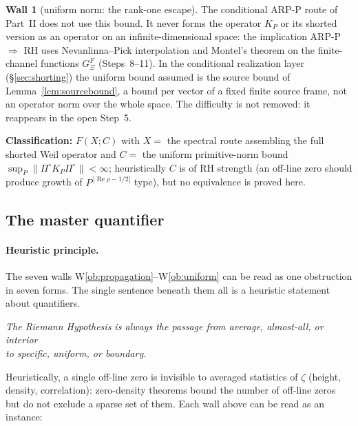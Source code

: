 \documentclass[11pt]{amsart}
\theoremstyle{definition}
\theoremstyle{remark}
\theoremstyle{definition}
\newtheorem{obstruction}{Wall}[section]
\renewcommand{\Re}{\operatorname{Re}}
\newcommand{\GXi}{G_\Xi}
\begin{document}
\begin{obstruction}[uniform norm: the rank-one escape]
The conditional ARP-P route of Part~II does not use this bound. It never forms the operator $K_P$ or its
shorted version as an operator on an infinite-dimensional space: the implication ARP-P $\Rightarrow$ RH
uses Nevanlinna--Pick interpolation and Montel's theorem on the finite-channel functions $\GXi^F$
(Steps~8--11). In the conditional realization layer (\S\ref{sec:shorting}) the uniform bound assumed is
the source bound of Lemma~\ref{lem:sourcebound}, a bound per vector of a fixed finite source frame, not
an operator norm over the whole space. The difficulty is not removed: it reappears in the open Step~5.

\smallskip\noindent\textbf{Classification:} $F(X;C)$ with $X=$ the spectral route assembling the
full shorted Weil operator and $C=$ the uniform primitive-norm bound
$\sup_P\|\Pi^\circ K_P\Pi^\circ\|<\infty$; heuristically $C$ is of RH strength (an off-line zero should
produce growth of $P^{\,|\Re\rho-1/2|}$ type), but no equivalence is proved here.
\end{obstruction}

\subsection{The master quantifier}\label{sec:masterquant}

\paragraph{Heuristic principle.} The seven walls W\ref{ob:propagation}--W\ref{ob:uniform} can be read as one obstruction in seven forms. The
single sentence beneath them all is a heuristic statement about quantifiers.

\begin{center}
\emph{The Riemann Hypothesis is always the passage from average, almost-all, or interior\\
to specific, uniform, or boundary.}
\end{center}

Heuristically, a single off-line zero is invisible to averaged statistics of $\zeta$ (height, density,
correlation): zero-density theorems bound the number of off-line zeros but do not exclude a sparse set of
them. Each wall above can be read as an instance:
\end{document}
